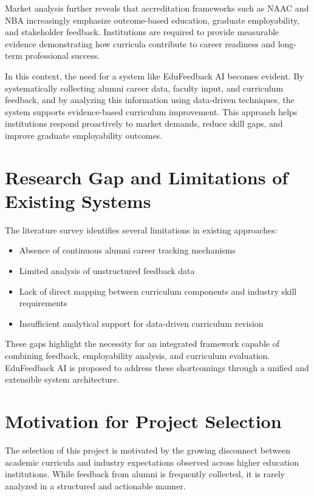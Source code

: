 Market analysis further reveals that accreditation frameworks such as NAAC and NBA increasingly emphasize outcome-based education, graduate employability, and stakeholder feedback. Institutions are required to provide measurable evidence demonstrating how curricula contribute to career readiness and long-term professional success.

In this context, the need for a system like EduFeedback AI becomes evident. By systematically collecting alumni career data, faculty input, and curriculum feedback, and by analyzing this information using data-driven techniques, the system supports evidence-based curriculum improvement. This approach helps institutions respond proactively to market demands, reduce skill gaps, and improve graduate employability outcomes.

\section{Research Gap and Limitations of Existing Systems}
The literature survey identifies several limitations in existing approaches:
\begin{itemize}
    \item Absence of continuous alumni career tracking mechanisms
    \item Limited analysis of unstructured feedback data
    \item Lack of direct mapping between curriculum components and industry skill requirements
    \item Insufficient analytical support for data-driven curriculum revision
\end{itemize}

These gaps highlight the necessity for an integrated framework capable of combining feedback, employability analysis, and curriculum evaluation. EduFeedback AI is proposed to address these shortcomings through a unified and extensible system architecture.

\section{Motivation for Project Selection}
The selection of this project is motivated by the growing disconnect between academic curricula and industry expectations observed across higher education institutions. While feedback from alumni is frequently collected, it is rarely analyzed in a structured and actionable manner.

